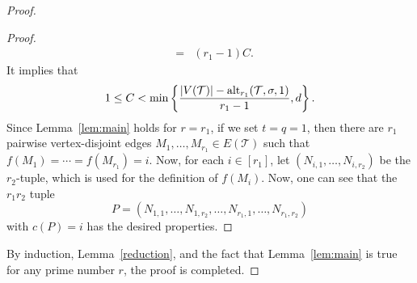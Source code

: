 \documentclass[11pt]{amsart}
\theoremstyle{definition}
\theoremstyle{remark}
\def\T{\mathsf{T}}
\def\T{\mathcal{T}}
\begin{document}
\begin{proof}
\begin{proof}
$$\begin{array}{lll}
			       &   =    & (r_1-1)C.
\end{array}$$
It implies that 
$$1\leq C<\min\left\{{|V(\T)|-{\rm alt}_{r_1}(\T,\sigma,1)\over r_1-1},d\right\}.$$
Since Lemma~\ref{lem:main} holds for $r=r_1$, if we set $t=q=1$, then
there are $r_1$ pairwise vertex-disjoint edges $M_1,\ldots,M_{r_1}\in E(\T)$
such that $f(M_1)=\cdots=f(M_{r_1})=i$. 
Now, for each $i\in[r_1]$, let $(N_{i,1},\ldots,N_{i,r_2})$ be the $r_2$-tuple, which is
used for the definition of  $f(M_i)$. Now, one can see that the $r_1r_2$ tuple
$$P=\left(N_{1,1},\ldots,N_{1,r_2},\ldots,N_{r_1,1},\ldots,N_{r_1,r_2}\right)$$  with $c(P)=i$ has the desired properties. 
\end{proof}
By induction, Lemma~\ref{reduction},  and the fact  that
Lemma~\ref{lem:main} is true for any prime number $r$, the proof is 
completed.
\end{proof}

\end{document}
